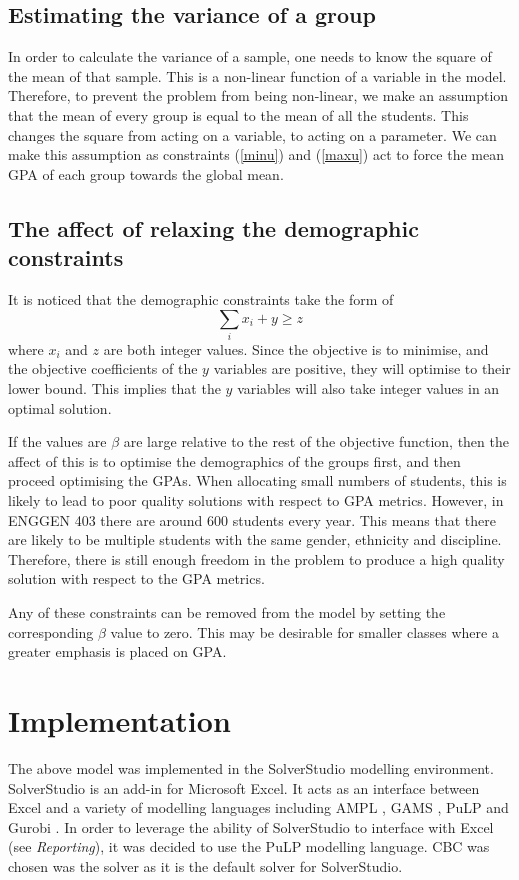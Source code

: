 \documentclass[12pt]{ORSNZ}
\begin{document}
\subsection{Estimating the variance of a group}
In order to calculate the variance of a sample, one needs to know the square of the mean of that sample. This is a non-linear function of a variable in the model. Therefore, to prevent the problem from being non-linear, we make an assumption that the mean of every group is equal to the mean of all the students. This changes the square from acting on a variable, to acting on a parameter. We can make this assumption as constraints (\ref{minu}) and (\ref{maxu}) act to force the mean GPA of each group towards the global mean.

\subsection{The affect of relaxing the demographic constraints}
It is noticed that the demographic constraints take the form of 
\begin{equation}
\sum_i x_i + y \geq z
\end{equation}
where $x_i$ and $z$ are both integer values. Since the objective is to minimise, and the objective coefficients of the $y$ variables are positive, they will optimise to their lower bound. This implies that the $y$ variables will also take integer values in an optimal solution. 

If the values are $\beta$ are large relative to the rest of the objective function, then the affect of this is to optimise the demographics of the groups first, and then proceed optimising the GPAs. When allocating small numbers of students, this is likely to lead to poor quality solutions with respect to GPA metrics. However, in ENGGEN 403 there are around 600 students every year. This means that there are likely to be multiple students with the same gender, ethnicity and discipline. Therefore, there is still enough freedom in the problem to produce a high quality solution with respect to the GPA metrics.

Any of these constraints can be removed from the model by setting the corresponding $\beta$ value to zero. This may be desirable for smaller classes where a greater emphasis is placed on GPA.

\section{Implementation}
The above model was implemented in the SolverStudio \cite{solverstudio} modelling environment. SolverStudio is an add-in for Microsoft Excel. It acts as an interface between Excel and a variety of modelling languages including AMPL \cite{ampl}, GAMS \cite{gams}, PuLP \cite{pulp} and Gurobi \cite{gurobi}. In order to leverage the ability of SolverStudio to interface with Excel (see \emph{Reporting}), it was decided to use the PuLP modelling language. CBC was chosen was the solver as it is the default solver for SolverStudio.
\end{document}
